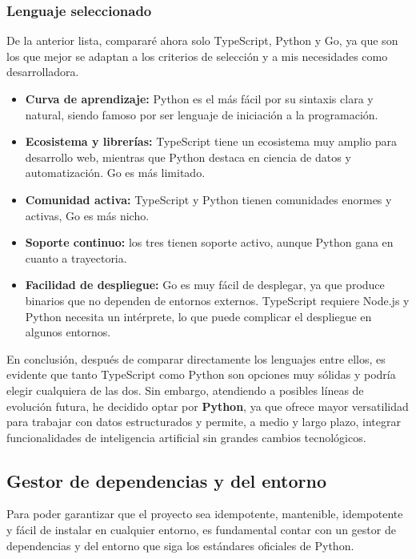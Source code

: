 \subsubsection{Lenguaje seleccionado}
De la anterior lista, compararé ahora solo TypeScript, Python y Go, ya que son los que
mejor se adaptan a los criterios de selección y a mis necesidades como desarrolladora.

\begin{itemize}
    \item \textbf{Curva de aprendizaje:} Python es el más fácil por su sintaxis clara y
    natural, siendo famoso por ser lenguaje de iniciación a la programación.
    \item \textbf{Ecosistema y librerías:} TypeScript tiene un ecosistema muy amplio 
    para desarrollo web, mientras que Python destaca en ciencia de datos y automatización.
    Go es más limitado.
    \item \textbf{Comunidad activa:} TypeScript y Python tienen comunidades enormes y
    activas, Go es más nicho.
    \item \textbf{Soporte continuo:} los tres tienen soporte activo, aunque Python gana en
    cuanto a trayectoria.
    \item \textbf{Facilidad de despliegue:} Go es muy fácil de desplegar, ya que produce
    binarios que no dependen de entornos externos. TypeScript requiere Node.js
    y Python necesita un intérprete, lo que puede complicar el despliegue en algunos
    entornos.
\end{itemize}

En conclusión, después de comparar directamente los lenguajes entre ellos, es evidente
que tanto TypeScript como Python son opciones muy sólidas y podría elegir cualquiera de las
dos. Sin embargo, atendiendo a posibles líneas de evolución futura, he decidido optar por
\textbf{Python}, ya que ofrece mayor versatilidad para trabajar con datos estructurados y 
permite, a medio y largo plazo, integrar funcionalidades de inteligencia artificial sin 
grandes cambios tecnológicos.

\subsection{Gestor de dependencias y del entorno}\label{sec:gestor-dependencias}
Para poder garantizar que el proyecto sea idempotente, mantenible, idempotente y fácil de instalar en 
cualquier entorno, es fundamental contar con un gestor de dependencias y del entorno que
siga los estándares oficiales de Python. 

